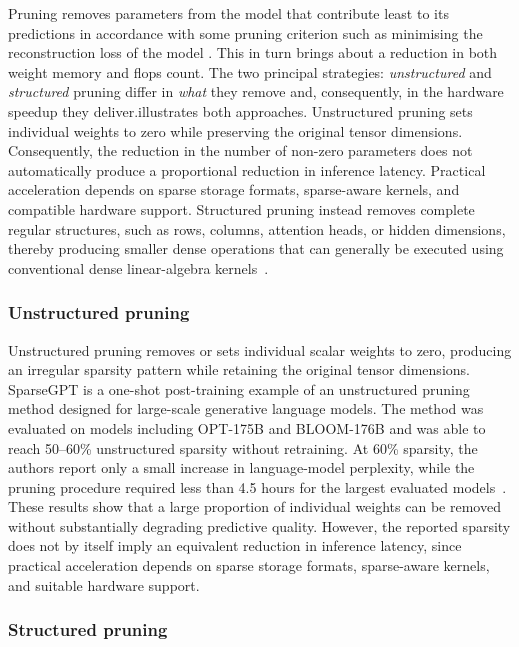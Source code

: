 Pruning removes parameters from the model that contribute least to its predictions in accordance with some pruning criterion such as minimising the reconstruction loss of the model \cite{zhou2024efficientinf}. This in turn brings about a reduction in both weight memory and \ac{flops} count. The two principal strategies: \emph{unstructured} and \emph{structured} pruning differ in \emph{what} they remove and, consequently, in the hardware speedup they deliver.illustrates both approaches. Unstructured pruning sets individual weights to zero while preserving
the original tensor dimensions. Consequently, the reduction in the
number of non-zero parameters does not automatically produce a
proportional reduction in inference latency. Practical acceleration
depends on sparse storage formats, sparse-aware kernels, and compatible
hardware support. Structured pruning instead removes complete regular
structures, such as rows, columns, attention heads, or hidden
dimensions, thereby producing smaller dense operations that can
generally be executed using conventional dense linear-algebra
kernels~\cite{frantar2022spdy,wang2019structured}.


\subsubsection{Unstructured pruning}\label{unstructured-pruning} 

Unstructured pruning removes or sets individual scalar weights to zero, producing an irregular sparsity pattern while retaining the original tensor dimensions. SparseGPT is a one-shot post-training example of an unstructured pruning method designed for
large-scale generative language models. The method was evaluated on
models including OPT-175B and BLOOM-176B and was able to reach
50--60\% unstructured sparsity without retraining. At 60\% sparsity,
the authors report only a small increase in language-model perplexity,
while the pruning procedure required less than 4.5 hours for the
largest evaluated models~\cite{frantar2023sparsegpt}. These results
show that a large proportion of individual weights can be removed
without substantially degrading predictive quality. However, the
reported sparsity does not by itself imply an equivalent reduction in
inference latency, since practical acceleration depends on sparse
storage formats, sparse-aware kernels, and suitable hardware support. 

\subsubsection{Structured pruning}\label{structured-pruning} 

